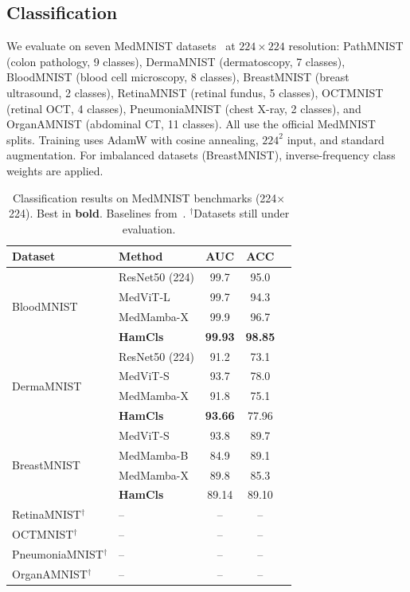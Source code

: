 \documentclass[11pt]{article}
\begin{document}
\subsection{Classification}

We evaluate on seven MedMNIST datasets~\cite{yang2023medmnist} at $224 \times 224$ resolution: PathMNIST (colon pathology, 9 classes), DermaMNIST (dermatoscopy, 7 classes), BloodMNIST (blood cell microscopy, 8 classes), BreastMNIST (breast ultrasound, 2 classes), RetinaMNIST (retinal fundus, 5 classes), OCTMNIST (retinal OCT, 4 classes), PneumoniaMNIST (chest X-ray, 2 classes), and OrganAMNIST (abdominal CT, 11 classes). All use the official MedMNIST splits. Training uses AdamW with cosine annealing, $224^2$ input, and standard augmentation. For imbalanced datasets (BreastMNIST), inverse-frequency class weights are applied.

\begin{table}[t]
\centering
\caption{Classification results on MedMNIST benchmarks (224$\times$224). Best in \textbf{bold}. Baselines from~\cite{yue2024medmamba}. $^\dagger$Datasets still under evaluation.}
\label{tab:cls_results}
\small
\begin{tabular}{@{}llccc@{}}
\toprule
Dataset & Method & AUC & ACC \\
\midrule
\multirow{4}{*}{BloodMNIST} & ResNet50 (224) & 99.7 & 95.0 \\
& MedViT-L & 99.7 & 94.3 \\
& MedMamba-X & 99.9 & 96.7 \\
& \textbf{HamCls} & \textbf{99.93} & \textbf{98.85} \\
\midrule
\multirow{4}{*}{DermaMNIST} & ResNet50 (224) & 91.2 & 73.1 \\
& MedViT-S & 93.7 & 78.0 \\
& MedMamba-X & 91.8 & 75.1 \\
& \textbf{HamCls} & \textbf{93.66} & 77.96 \\
\midrule
\multirow{4}{*}{BreastMNIST} & MedViT-S & 93.8 & 89.7 \\
& MedMamba-B & 84.9 & 89.1 \\
& MedMamba-X & 89.8 & 85.3 \\
& \textbf{HamCls} & 89.14 & 89.10 \\
\midrule
RetinaMNIST$^\dagger$ & -- & -- & -- \\
OCTMNIST$^\dagger$ & -- & -- & -- \\
PneumoniaMNIST$^\dagger$ & -- & -- & -- \\
OrganAMNIST$^\dagger$ & -- & -- & -- \\
\bottomrule
\end{tabular}
\end{table}
\end{document}
